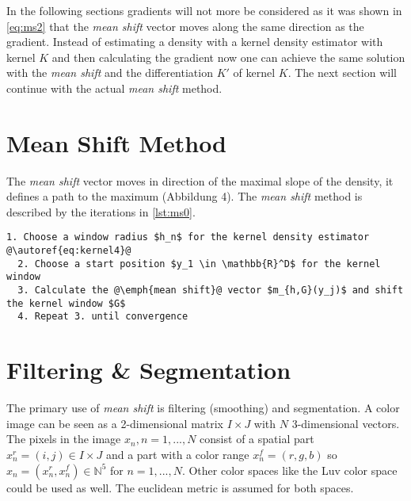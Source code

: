 In the following sections gradients will not more be considered as it was shown
in \autoref{eq:ms2} that the \emph{mean shift} vector moves along the same
direction as the gradient. Instead of estimating a density with a kernel 
density estimator with kernel $K$ and then calculating the gradient now one can
achieve the same solution with the \emph{mean shift} and the differentiation
$K'$ of kernel $K$. The next section will continue with the actual \emph{mean shift}
method.

\section{Mean Shift Method} 
\label{sec:mean_shift_method}

The \emph{mean shift} vector moves in direction of the maximal slope of the
density, it defines a path to the maximum (Abbildung 4). The \emph{mean shift}
method is described by the iterations in \autoref{lst:ms0}. \\

\begin{lstlisting}[caption=Generic mean shift method, label=lst:ms0, mathescape, numbers=none, escapechar=@, keywordstyle=\color{black}]
  1. Choose a window radius $h_n$ for the kernel density estimator @\autoref{eq:kernel4}@
  2. Choose a start position $y_1 \in \mathbb{R}^D$ for the kernel window
  3. Calculate the @\emph{mean shift}@ vector $m_{h,G}(y_j)$ and shift the kernel window $G$
  4. Repeat 3. until convergence
\end{lstlisting}



\section{Filtering {\upshape\&} Segmentation} %
\label{sec:filtering_segmentation}
The primary use of \emph{mean shift} is filtering (smoothing) and segmentation. 
A color image can be seen as a 2-dimensional matrix $I \times J$ with $N$ 
3-dimensional vectors. The pixels in the image $x_n, n = 1, ... , N$ consist of
a spatial part $x_n^r = (i,j) \in I \times J$ and a part with a color range
$x_n^f = (r,g,b)$ so $x_n = (x_n^r, x_n^f) \in \mathbb{N}^5$ for $n = 1, ... , N$.
Other color spaces like the \gls{Luv} color space could be used as well. The 
euclidean metric is assumed for both spaces. 

